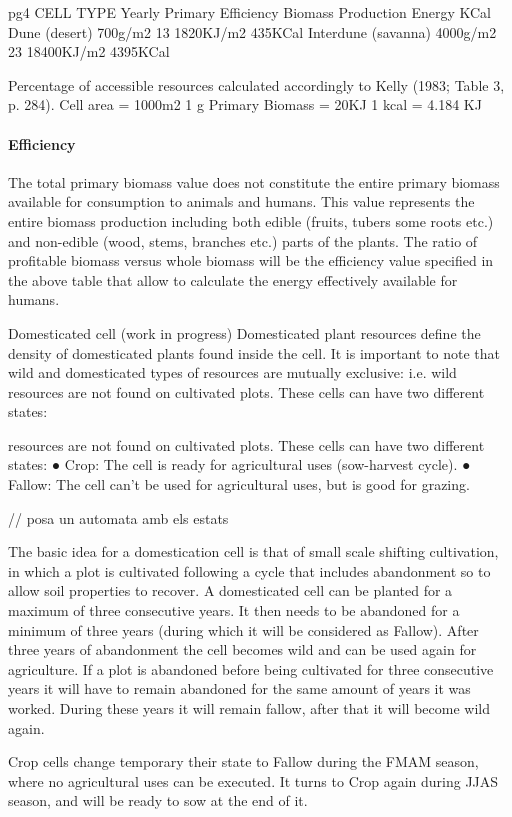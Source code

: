 pg4
\table
CELL TYPE
Yearly Primary Efficiency
Biomass
Production
Energy
KCal
Dune (desert)
700g/m2
13%
1820KJ/m2
435KCal
Interdune (savanna)
4000g/m2
23%
18400KJ/m2
4395KCal


Percentage of accessible resources calculated accordingly to Kelly (1983; Table 3, p. 284).
Cell area = 1000m2
1 g Primary Biomass = 20KJ
1 kcal = 4.184 KJ


\paragraph{Efficiency}
The total primary biomass value does not constitute the entire primary biomass available for
consumption to animals and humans. This value represents the entire biomass production
including both edible (fruits, tubers some roots etc.) and non-edible (wood, stems, branches
etc.) parts of the plants. The ratio of profitable biomass versus whole biomass will be the
efficiency value specified in the above table that allow to calculate the energy effectively
available for humans.


Domesticated cell (work in progress)
Domesticated plant resources define the density of domesticated plants found inside the cell. It is
important to note that wild and domesticated types of resources are mutually exclusive: i.e. wild
resources are not found on cultivated plots. These cells can have two different states:


resources are not found on cultivated plots. These cells can have two different states:
● Crop: The cell is ready for agricultural uses (sow-harvest cycle).
● Fallow: The cell can't be used for agricultural uses, but is good for grazing.

// posa un automata amb els estats

The basic idea for a domestication cell is that of small scale shifting cultivation, in which a plot is
cultivated following a cycle that includes abandonment so to allow soil properties to recover. A
domesticated cell can be planted for a maximum of three consecutive years. It then needs to be
abandoned for a minimum of three years (during which it will be considered as Fallow). After three
years of abandonment the cell becomes wild and can be used again for agriculture. If a plot is
abandoned before being cultivated for three consecutive years it will have to remain abandoned for
the same amount of years it was worked. During these years it will remain fallow, after that it will
become wild again.

Crop cells change temporary their state to Fallow during the FMAM season, where no agricultural
uses can be executed. It turns to Crop again during JJAS season, and will be ready to sow at the end
of it.



